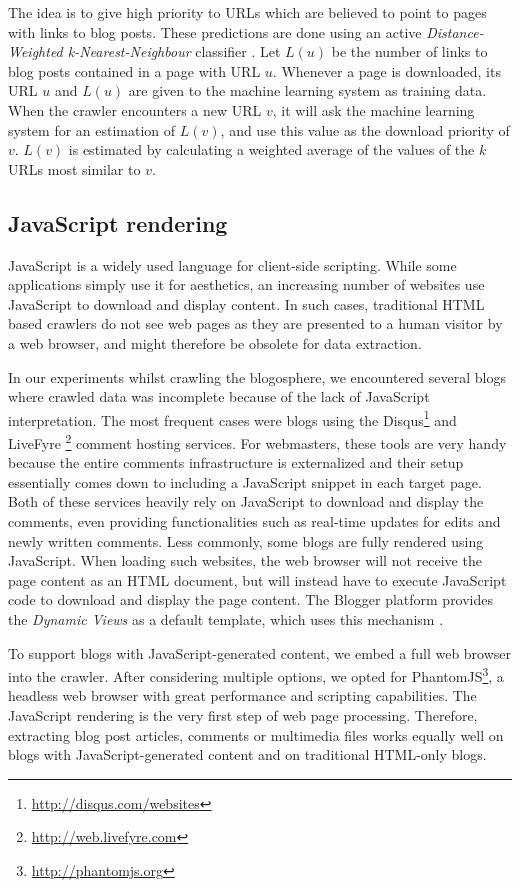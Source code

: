 The idea is to give high priority to URLs which are believed to point to pages with links to blog posts. These predictions are done using an active \emph{Distance-Weighted k-Nearest-Neighbour} classifier \cite{dudani1976}. Let $L(u)$ be the number of links to blog posts contained in a page with URL $u$. Whenever a page is downloaded, its URL $u$ and $L(u)$ are given to the machine learning system as training data. When the crawler encounters a new URL $v$, it will ask the machine learning system for an estimation of $L(v)$, and use this value as the download priority of $v$. $L(v)$ is estimated by calculating a weighted average of the values of the $k$ URLs most similar to $v$.


\subsection{JavaScript rendering}

JavaScript is a widely used language for client-side scripting. While some applications simply use it for aesthetics, an increasing number of websites use JavaScript to download and display content. In such cases, traditional HTML based crawlers do not see web pages as they are presented to a human visitor by a web browser, and might therefore be obsolete for data extraction.

In our experiments whilst crawling the blogosphere, we encountered several blogs where crawled data was incomplete because of the lack of JavaScript interpretation. The most frequent cases were blogs using the Disqus\footnote{\url{http://disqus.com/websites}} and LiveFyre \footnote{\url{http://web.livefyre.com}} comment hosting services. For webmasters, these tools are very handy because the entire comments infrastructure is externalized and their setup essentially comes down to including a JavaScript snippet in each target page. Both of these services heavily rely on JavaScript to download and display the comments, even providing functionalities such as real-time updates for edits and newly written comments. Less commonly, some blogs are fully rendered using JavaScript. When loading such websites, the web browser will not receive the page content as an HTML document, but will instead have to execute JavaScript code to download and display the page content. The Blogger platform provides the \emph{Dynamic Views} as a default template, which uses this mechanism \cite{antinharasymiv2011}.

To support blogs with JavaScript-generated content, we embed a full web browser into the crawler. After considering multiple options, we opted for PhantomJS\footnote{\url{http://phantomjs.org}}, a headless web browser with great performance and scripting capabilities. The JavaScript rendering is the very first step of web page processing. Therefore, extracting blog post articles, comments or multimedia files works equally well on blogs with JavaScript-generated content and on traditional HTML-only blogs.

